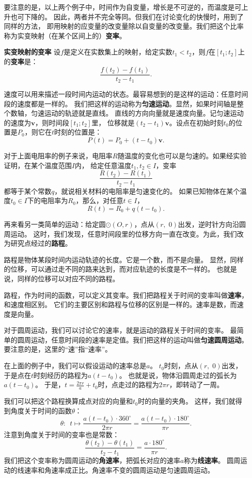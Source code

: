 \documentclass[12pt,UTF8,fontset=none]{ctexbook}
\begin{document}
要注意的是，以上两个例子中，时间作为自变量，增长是不可逆的，而温度是可上升也可下降的。
因此，两者并不完全等同。但我们在讨论变化的快慢时，用到了同样的方法，
即用映射的应变量的改变量除以自变量的改变量。我们把这个比率称为实变映射（在某个区间上的）\textbf{变率}。

\begin{df}{\textbf{实变映射的变率}}
    设$f$是定义在实数集上的映射，给定实数$t_1 < t_2$，则$f$在$[t_1;t_2]$上的\textbf{变率}是：
    $$ \frac{f(t_2) - f(t_1)}{t_2 - t_1}.$$
\end{df}

速度可以用来描述一段时间内运动的状态。最容易想到的是这样的运动：任意时间段的速度都是一样的。
我们把这样的运动称为\textbf{匀速运动}。显然，如果时间轴是整个数轴，匀速运动的轨迹就是直线。
直线的方向向量就是速度向量。记匀速运动的速度为$\mathbf{v}$，则时间段$[t_1;t_2]$里，
位移就是$(t_2 - t_1)\mathbf{v}$。设点在初始时刻$t_0$的位置是$P_0$，则它在$t$时刻的位置是：
$$P(t) = P_0 + (t - t_0)\mathbf{v}.$$

对于上面电阻率的例子来说，电阻率$R$随温度的变化也可以是匀速的。如果经实验证明，在某个温度范围$I$内，
给定任意温度$t_1, t_2 \in I$，变率
$$ \frac{R(t_2) - R(t_1)}{t_2 - t_1} $$
都等于某个常数$q$，就说相关材料的电阻率是匀速变化的。
如果已知物体在某个温度$t_0\in I$下的电阻率为$R_0$，那么，对任意$t\in I$，
$$ R(t) = R_0 + q(t - t_0). $$

再来看另一类简单的运动：给定圆$\odot(O, r)$，点从$(r,\,\, 0)$出发，逆时针方向沿圆周运动。
这时，我们发现，任意时间段里的位移方向一直在改变。为此，我们改为研究点经过的\textbf{路程}。

路程是物体某段时间内运动轨迹的长度。它是一个数，而不是向量。
显然，同样的位移，可以通过走不同的路来达到，而对应轨迹的长度是不一样的。
也就是说，同样的位移可以对应不同的路程。

路程，作为时间的函数，可以定义其变率。我们把路程关于时间的变率叫做\textbf{速率}，和速度相区别。
它们的主要区别和路程与位移的区别是一样的。速率是数，而速度是向量。

对于圆周运动，我们可以讨论它的速率，就是运动的路程关于时间的变率。
最简单的圆周运动，任意时间段的速率是定值。我们把这样的运动叫做\textbf{匀速圆周运动}。
要注意的是，这里的“速”指“速率”。

在上面的例子中，我们可以假设运动的速率总是$a$。
$t_0$时刻，点从$(r,\,\, 0)$出发，于是点在$t$时刻经历的路程为$a(t - t_0)$。
也就是说，物体沿圆周走过的弧长为$a(t - t_0)$。
于是，$t = \frac{2\pi r}{a} + t_0$时，点走过的路程为$2\pi r$，即转动了一周。

我们可以把这个路程换算成点对应的向量和$t_0$时的向量的夹角。
这样，我们就得到角度关于时间的函数$\theta$：
$$ \theta : \,\,\, t \mapsto \frac{a(t - t_0)\cdot 360^\circ}{2\pi r} = \frac{a(t - t_0)\cdot 180^\circ}{\pi r}.$$
注意到角度关于时间的变率也是常数：
$$ \frac{\theta(t_2) - \theta(t_1)}{t_2 - t_1} = \frac{a \cdot 180^\circ}{\pi r}.$$
我们把这个变率称为圆周运动的\textbf{角速率}，把弧长对应的速率$a$称为\textbf{线速率}。
圆周运动的线速率和角速率成正比。角速率不变的圆周运动是匀速圆周运动。
\end{document}
